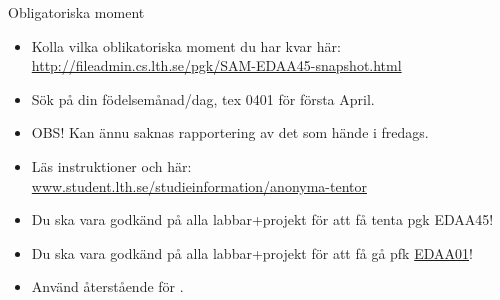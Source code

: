 
\begin{Slide}{Obligatoriska moment}\SlideFontSmall
\begin{itemize}
\item Kolla vilka oblikatoriska moment du har kvar här:
\url{http://fileadmin.cs.lth.se/pgk/SAM-EDAA45-snapshot.html}
\item Sök på din födelsemånad/dag, tex 0401 för första April.
\item OBS! Kan ännu saknas rapportering av det som hände i fredags.
\item Läs  instruktioner  och  här: \\
\href{http://www.student.lth.se/studieinformation/anonyma-tentor/}{www.student.lth.se/studieinformation/anonyma-tentor}
\item Du ska vara godkänd på alla labbar+projekt för att få tenta pgk EDAA45!
\item Du ska vara godkänd på alla labbar+projekt för att få gå pfk \href{http://cs.lth.se/edaa01vt}{EDAA01}!
\item Använd återstående  för .
\end{itemize}
\end{Slide}
%
